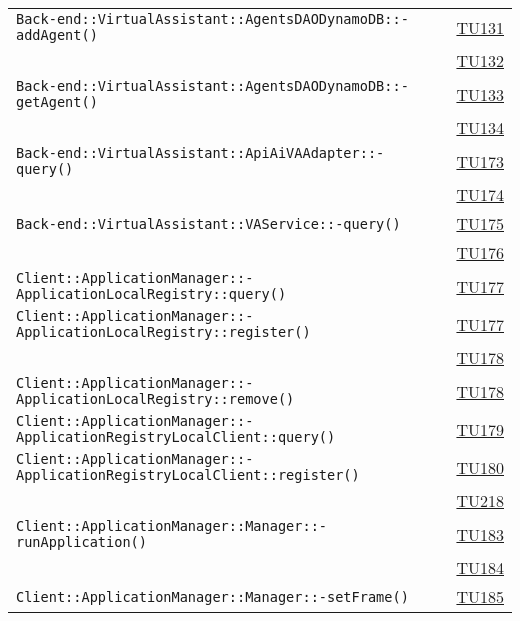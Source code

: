 \begin{longtable}{|>{\centering}m{12cm}|m{1cm}<{\centering}|}
\texttt{Back-end::VirtualAssistant::AgentsDAODynamoDB::-\linebreak addAgent()} & \hyperlink{TU131}{TU131}\\ & \hyperlink{TU132}{TU132}\\ \hline
\texttt{Back-end::VirtualAssistant::AgentsDAODynamoDB::-\linebreak getAgent()} & \hyperlink{TU133}{TU133}\\ & \hyperlink{TU134}{TU134}\\ \hline
\texttt{Back-end::VirtualAssistant::ApiAiVAAdapter::-\linebreak query()} & \hyperlink{TU173}{TU173}\\ & \hyperlink{TU174}{TU174}\\ \hline
\texttt{Back-end::VirtualAssistant::VAService::-\linebreak query()} & \hyperlink{TU175}{TU175}\\ & \hyperlink{TU176}{TU176}\\ \hline
\texttt{Client::ApplicationManager::-\linebreak ApplicationLocalRegistry::query()} & \hyperlink{TU177}{TU177}\\ \hline
\texttt{Client::ApplicationManager::-\linebreak ApplicationLocalRegistry::register()} & \hyperlink{TU177}{TU177}\\ & \hyperlink{TU178}{TU178}\\ \hline
\texttt{Client::ApplicationManager::-\linebreak ApplicationLocalRegistry::remove()} & \hyperlink{TU178}{TU178}\\ \hline
\texttt{Client::ApplicationManager::-\linebreak ApplicationRegistryLocalClient::query()} & \hyperlink{TU179}{TU179}\\ \hline
\texttt{Client::ApplicationManager::-\linebreak ApplicationRegistryLocalClient::register()} & \hyperlink{TU180}{TU180}\\ & \hyperlink{TU218}{TU218}\\ \hline
\texttt{Client::ApplicationManager::Manager::-\linebreak runApplication()} & \hyperlink{TU183}{TU183}\\ & \hyperlink{TU184}{TU184}\\ \hline
\texttt{Client::ApplicationManager::Manager::-\linebreak setFrame()} & \hyperlink{TU185}{TU185}\\ \hline

\end{longtable}

